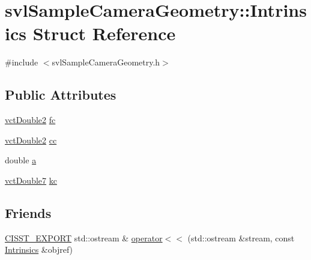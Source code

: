 \hypertarget{structsvl_sample_camera_geometry_1_1_intrinsics}{\section{svl\-Sample\-Camera\-Geometry\-:\-:Intrinsics Struct Reference}
\label{structsvl_sample_camera_geometry_1_1_intrinsics}
}


{\ttfamily \#include $<$svl\-Sample\-Camera\-Geometry.\-h$>$}

\subsection*{Public Attributes}
\begin{DoxyCompactItemize}
\item 
\hyperlink{vct_fixed_size_vector_types_8h_afc0fdcc41cbe8b043747612501610812}{vct\-Double2} \hyperlink{structsvl_sample_camera_geometry_1_1_intrinsics_a695218668b61d9a523078479ffa9f336}{fc}
\item 
\hyperlink{vct_fixed_size_vector_types_8h_afc0fdcc41cbe8b043747612501610812}{vct\-Double2} \hyperlink{structsvl_sample_camera_geometry_1_1_intrinsics_a8389a02bf8568e620b28357cfe929fd4}{cc}
\item 
double \hyperlink{structsvl_sample_camera_geometry_1_1_intrinsics_acc4d74ab02068cce2268ce6f622b2b78}{a}
\item 
\hyperlink{vct_fixed_size_vector_types_8h_a600a52ac438879e14dd78db8002d2681}{vct\-Double7} \hyperlink{structsvl_sample_camera_geometry_1_1_intrinsics_a6c912ef66be611a6d9815e1910b27f4f}{kc}
\end{DoxyCompactItemize}
\subsection*{Friends}
\begin{DoxyCompactItemize}
\item 
\hyperlink{cmn_export_macros_8h_a99393e0c3ac434b2605235bbe20684f8}{C\-I\-S\-S\-T\-\_\-\-E\-X\-P\-O\-R\-T} std\-::ostream \& \hyperlink{structsvl_sample_camera_geometry_1_1_intrinsics_a6c2c0ff871a8f9bf6e1923772f097843}{operator$<$$<$} (std\-::ostream \&stream, const \hyperlink{structsvl_sample_camera_geometry_1_1_intrinsics}{Intrinsics} \&objref)
\end{DoxyCompactItemize}


